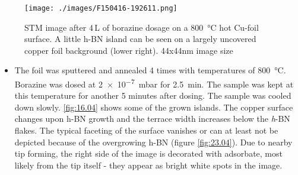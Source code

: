\begin{figure}
 \centering
 \texttt{[image: ./images/F150416-192611.png]}
 \caption{STM image after 4\,L of borazine dosage on a \SI{800}{\degreeCelsius} hot Cu-foil surface. A little h-BN island can be seen on a largely uncovered copper foil background (lower right). 44x44nm image size}
 \label{fig:16.04}
\end{figure}
% 
\begin{itemize}
 \item The foil was sputtered and annealed 4 times with temperatures of \SI{800}{\degreeCelsius}. Borazine was dosed at \SI{2e-7}{\milli \bar} for \SI{2.5}{\minute}. The sample was kept at this temperature for another 5 minutes after dosing. The sample was cooled down slowly. \autoref{fig:16.04} shows some of the grown islands. The copper surface changes upon h-BN growth and the terrace width increases below the \textit{h}-BN flakes. The typical faceting of the surface vanishes or can at least not be depicted because of the overgrowing h-BN (figure \ref{fig:23.04}). Due to nearby tip forming, the right side of the image is decorated with adsorbate, most likely from the tip itself - they appear as bright white spots in the image.
\end{itemize}
